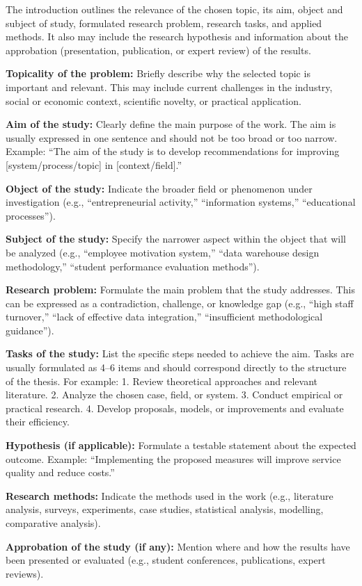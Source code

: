 
The introduction outlines the relevance of the chosen topic, its aim, object and subject of study, formulated research problem, research tasks, and applied methods. It also may include the research hypothesis and information about the approbation (presentation, publication, or expert review) of the results.  

\textbf{Topicality of the problem:}  
Briefly describe why the selected topic is important and relevant. This may include current challenges in the industry, social or economic context, scientific novelty, or practical application.  

\textbf{Aim of the study:}  
Clearly define the main purpose of the work. The aim is usually expressed in one sentence and should not be too broad or too narrow. Example: “The aim of the study is to develop recommendations for improving [system/process/topic] in [context/field].”  

\textbf{Object of the study:}  
Indicate the broader field or phenomenon under investigation (e.g., “entrepreneurial activity,” “information systems,” “educational processes”).  

\textbf{Subject of the study:}  
Specify the narrower aspect within the object that will be analyzed (e.g., “employee motivation system,” “data warehouse design methodology,” “student performance evaluation methods”).  

\textbf{Research problem:}  
Formulate the main problem that the study addresses. This can be expressed as a contradiction, challenge, or knowledge gap (e.g., “high staff turnover,” “lack of effective data integration,” “insufficient methodological guidance”).  

\textbf{Tasks of the study:}  
List the specific steps needed to achieve the aim. Tasks are usually formulated as 4–6 items and should correspond directly to the structure of the thesis. For example:  
1. Review theoretical approaches and relevant literature.  
2. Analyze the chosen case, field, or system.  
3. Conduct empirical or practical research.  
4. Develop proposals, models, or improvements and evaluate their efficiency.  

\textbf{Hypothesis (if applicable):}  
Formulate a testable statement about the expected outcome. Example: “Implementing the proposed measures will improve service quality and reduce costs.”  

\textbf{Research methods:}  
Indicate the methods used in the work (e.g., literature analysis, surveys, experiments, case studies, statistical analysis, modelling, comparative analysis).  

\textbf{Approbation of the study (if any):}  
Mention where and how the results have been presented or evaluated (e.g., student conferences, publications, expert reviews).  
